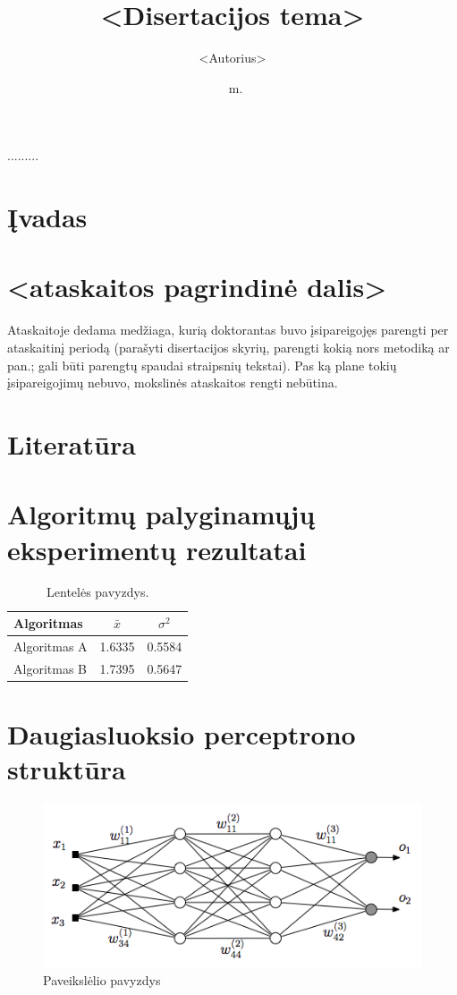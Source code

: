 \documentclass[11pt, a4paper, lithuanian]{article}
\date{\the\year\ m.\monthlt[\month]}
\title{<Disertacijos tema>}
\author{<Autorius>}
\begin{document}
\maketitle

.........


\tableofcontents

\section{Įvadas}

\section{<ataskaitos pagrindinė dalis>}
Ataskaitoje dedama medžiaga, kurią doktorantas buvo įsipareigojęs parengti per
ataskaitinį periodą (parašyti disertacijos skyrių, parengti kokią nors metodiką
ar pan.; gali būti parengtų spaudai straipsnių tekstai). Pas ką plane tokių
įsipareigojimų nebuvo, mokslinės ataskaitos rengti nebūtina.

\section{Literatūra}%
%    

\appendix
\section{Algoritmų palyginamųjų eksperimentų rezultatai}
\begin{table}[H]
  \centering
  \caption{Lentelės pavyzdys.}
  {\begin{tabular}{|l|c|c|} \hline
    Algoritmas    & $\bar{x}$ & $\sigma^{2}$ \\
    \hline
    Algoritmas A  & 1.6335    & 0.5584       \\
    Algoritmas B  & 1.7395    & 0.5647       \\
    \hline
  \end{tabular}}
  \label{tab:table example}
\end{table}

\section{Daugiasluoksio perceptrono struktūra}
\begin{figure}[H]
    \centering
\includegraphics[scale=0.5]{img/MLP}
\caption{Paveikslėlio pavyzdys}
\end{figure}
\end{document}
